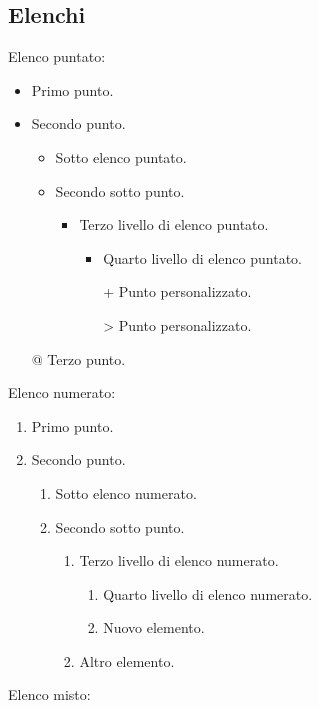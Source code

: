 \documentclass[a4paper,12pt,oneside]{book}
\theoremstyle{plain}
\begin{document}
	\subsection{Elenchi}
	Elenco puntato:
	\begin{itemize}
		\item Primo punto.
		\item Secondo punto.
		\begin{itemize}
			\item Sotto elenco puntato.
			\item Secondo sotto punto.
			\begin{itemize}
				\item Terzo livello di elenco puntato.
				\begin{itemize}
					\item Quarto livello di elenco puntato.
					\item [+] Punto personalizzato.
					\item [>] Punto personalizzato.
				\end{itemize}
			\end{itemize}
		\end{itemize}
		\item [@] Terzo punto.
	\end{itemize}
	Elenco numerato:
	\begin{enumerate}
		\item Primo punto.
		\item Secondo punto.
		\begin{enumerate}
			\item Sotto elenco numerato.
			\item Secondo sotto punto.
			\begin{enumerate}
				\item Terzo livello di elenco numerato.
				\begin{enumerate}
					\item Quarto livello di elenco numerato.
					\item Nuovo elemento.
				\end{enumerate}
				\item Altro elemento.
			\end{enumerate}
		\end{enumerate}
	\end{enumerate}
	\newpage
	Elenco misto:
\end{document}

